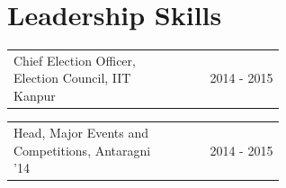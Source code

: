 \documentclass[a4paper]{article} %
\newcommand{\verticalspacing}{-0.25cm}
\newcommand{\headspace}{-0.3cm}
\newcommand{\bulletspace}{0.7cm}
\newcommand{\projectheadspacing}{6.9cm}
\newcommand{\gitproject}[3]{%
    \begin{tabular}{p{0.60\linewidth}r}
        \textcolor{NavyBlue}{\small #2} & \multicolumn{1}{m{ \projectheadspacing{} }}{\raggedleft #1}\\
    \end{tabular}\\
    \begin{tabular}{p{0.98\linewidth}}
        \vspace{\headspace{}}
        \small{#3}
    \end{tabular}
    \vspace{\verticalspacing{}}
    \vspace{-0.2cm} %
}
\newcommand{\skill}[2]{%
    \begin{tabular}{p{0.60\linewidth}r}
        \small {#2} & \multicolumn{1}{m{ \projectheadspacing{} }}{\raggedleft \textsc{\small #1}}\\
    \end{tabular}
    \vspace{\verticalspacing{}}
}
\begin{document}

\section {Leadership Skills}

\skill
    {2014 - 2015}
    {Chief Election Officer, Election Council, IIT Kanpur}


\skill
    {2014 - 2015}
    {Head, Major Events and Competitions, Antaragni '14}

\end{document}
